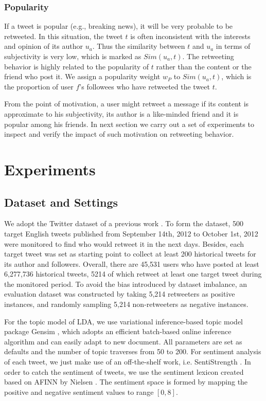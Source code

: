 \documentclass[letterpaper]{article}
\begin{document}
\subsubsection{Popularity}

If a tweet is popular (e.g., breaking news), it will be very probable to be retweeted. In this situation, the tweet $ t $ is often inconsistent with the interests and opinion of its author $ u_a $. Thus the similarity between $ t $ and $ u_a $ in terms of subjectivity is very low, which is marked as $ Sim(u_a,t) $. The retweeting behavior is highly related to the popularity of $ t $ rather than the content or the friend who post it. We assign a popularity weight $ w_P $ to $ Sim(u_a,t) $, which is the proportion of user $ f $'s followees who have retweeted the tweet $ t $.

From the point of motivation, a user might retweet a message if its content is approximate to his subjectivity, its author is a like-minded friend and it is popular among his friends. 
In next section we carry out a set of experiments to inspect and verify the impact of such motivation on retweeting behavior. 

\section{Experiments}
\label{experiments}

\subsection{Dataset and Settings}
We adopt the Twitter dataset of a previous work \cite{Luo:2013RMF}. 
To form the dataset, 500 target English tweets published from September 14th, 2012 to October 1st, 2012 were monitored to find who would retweet it in the next days. 
Besides, each target tweet was set as starting point to collect at least 200 historical tweets for its author and followers.
Overall, there are 45,531 users who have posted at least 6,277,736 historical tweets, 5214 of which retweet at least one target tweet during the monitored period. To avoid the bias introduced by dataset imbalance, an evaluation dataset was constructed by taking 5,214 retweeters as positive instances, and randomly sampling 5,214 non-retweeters as negative instances. 

For the topic model of LDA, we use variational inference-based topic model package Gensim \cite{rehurek_lrec}, which adopts an efficient batch-based online inference algorithm and can easily adapt to new document. All parameters are set as defaults and the number of topic traverses from 50 to 200. For sentiment analysis of each tweet, we just make use of an off-the-shelf work, i.e. SentiStrength \cite{thelwall2010sentiment}. In order to catch the sentiment of tweets, we use the sentiment lexicon created based on AFINN by Nielsen \cite{MohammadKZ2013}. The sentiment space is formed by mapping the positive and negative sentiment values to range $ [0,8] $.
\end{document}
